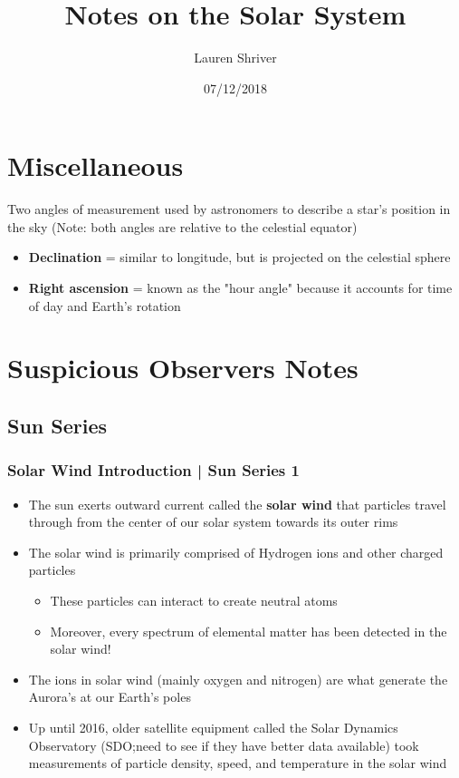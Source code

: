 \documentclass[a4paper]{article}
\title{Notes on the Solar System}
\author{Lauren Shriver}
\date{07/12/2018}
\begin{document}
	\maketitle
	\section{Miscellaneous}
	Two angles of measurement used by astronomers to describe a star's position in the sky (Note: both angles are relative to the celestial equator)
	\begin{itemize}
		\item \textbf{Declination} = similar to longitude, but is projected on the celestial sphere
		\item \textbf{Right ascension} = known as the "hour angle" because it accounts for time of day and Earth's rotation 
	\end{itemize}
	\section{Suspicious Observers Notes}
	\subsection*{Sun Series}
	\subsubsection*{Solar Wind Introduction | Sun Series 1}
			\begin{itemize}
				\item The sun exerts outward current called the \textbf{solar wind} that particles travel through from the center of our solar system towards its outer rims 
				\item The solar wind is primarily comprised of Hydrogen ions and other charged particles 
					\begin{itemize}
						\item These particles can interact to create neutral atoms 
						\item Moreover, every spectrum of elemental matter has been detected in the solar wind!
					\end{itemize}
				\item The ions in solar wind (mainly oxygen and nitrogen) are what generate the Aurora's at our Earth's poles 
				\item Up until 2016, older satellite equipment called the Solar Dynamics Observatory (SDO;need to see if they have better data available) took measurements of particle density, speed, and temperature in the solar wind 
			\end{itemize}
\end{document}
